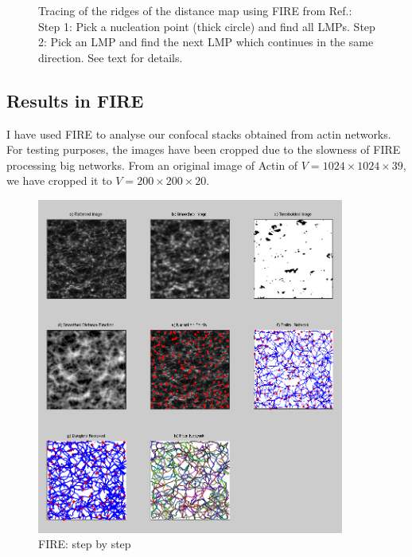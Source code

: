 \begin{figure}[h]
\caption[FIRE algorithm - Find LMP]{Tracing of the ridges of the distance
map using FIRE from Ref.\citep{stein_algorithm_2008}:  Step 1:
Pick a nucleation point (thick circle) and find all LMPs.  Step 2:
Pick an LMP and find the next LMP which continues in the same direction. See
text for details.}
\label{fig:fire_LMPS}
\end{figure}





 
 
\subsection{Results in FIRE}
 I have used FIRE to analyse our
 confocal stacks obtained from actin networks. For testing purposes, the images
have been cropped due to the slowness of FIRE
processing big networks. From an original image of Actin of
$V=1024\times1024\times39$, we have cropped it to $V=200\times200\times20$. 

\begin{figure}[h]

\begin{center}
\includegraphics[width=0.9\textwidth]{Figures/chapter-image/fire/fire012.png}%

\end{center}


\caption[Fire: Step by step for $T_P=0.12$]{FIRE: step by step}
\label{fig:fire_stepbystep}
\end{figure}

